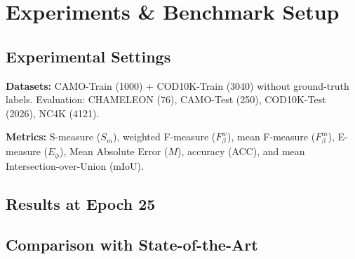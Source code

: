 \documentclass[journal,twoside,web]{IEEEtran}
\newcommand{\methodname}{UCOD-ADF}
\begin{document}
\section{Experiments \& Benchmark Setup}
\label{sec:experiments}

\subsection{Experimental Settings}
\textbf{Datasets:} CAMO-Train (1000) + COD10K-Train (3040) without ground-truth labels. Evaluation: CHAMELEON (76), CAMO-Test (250), COD10K-Test (2026), NC4K (4121).

\textbf{Metrics:} S-measure ($S_m$), weighted F-measure ($F_\beta^w$), mean F-measure ($F_\beta^m$), E-measure ($E_\phi$), Mean Absolute Error ($M$), accuracy (ACC), and mean Intersection-over-Union (mIoU).

\subsection{Results at Epoch 25}

\begin{table}[t]
\centering
\caption{\methodname{} quantitative results across all four test benchmarks, checkpoint at epoch 25.}
\label{tab:epoch25_results}
\end{table}

\subsection{Comparison with State-of-the-Art}
\end{document}
